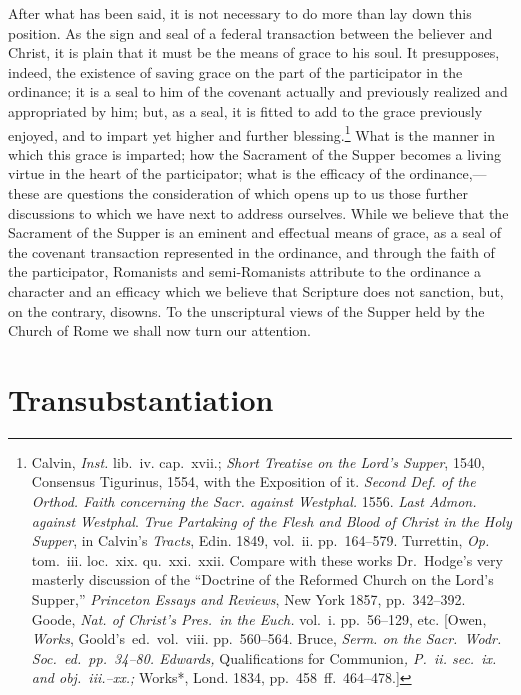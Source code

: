 \documentclass[
]{book}
\begin{document}
After what has been said, it is not necessary to do more than lay down this position. As the sign and seal of a federal transaction between the believer and Christ, it is plain that it must be the means of grace to his soul. It presupposes, indeed, the existence of saving grace on the part of the participator in the ordinance; it is a seal to him of the covenant actually and previously realized and appropriated by him; but, as a seal, it is fitted to add to the grace previously enjoyed, and to impart yet higher and further blessing.\footnote{Calvin, \emph{Inst.} lib.~iv. cap.~xvii.; \emph{Short Treatise on the Lord's Supper}, 1540, Consensus Tigurinus, 1554, with the Exposition of it. \emph{Second Def. of the Orthod. Faith concerning the Sacr. against Westphal.} 1556. \emph{Last Admon. against Westphal}. \emph{True Partaking of the Flesh and Blood of Christ in the Holy Supper}, in Calvin's \emph{Tracts}, Edin. 1849, vol.~ii. pp.~164--579. Turrettin, \emph{Op.} tom.~iii. loc.~xix. qu.~xxi.~xxii. Compare with these works Dr.~Hodge's very masterly discussion of the ``Doctrine of the Reformed Church on the Lord's Supper,'' \emph{Princeton Essays and Reviews}, New York 1857, pp.~342--392. Goode, \emph{Nat. of Christ's Pres.~in the Euch.} vol.~i. pp.~56--129, etc. {[}Owen, \emph{Works}, Goold's~ed.~vol.~viii. pp.~560--564. Bruce, \emph{Serm. on the Sacr.~Wodr. Soc.~ed.~pp.~34--80. Edwards, }Qualifications for Communion\emph{, P.~ii. sec.~ix. and obj.~iii.--xx.; }Works*, Lond. 1834, pp.~458~ff.~464--478.{]}} What is the manner in which this grace is imparted; how the Sacrament of the Supper becomes a living virtue in the heart of the participator; what is the efficacy of the ordinance,---these are questions the consideration of which opens up to us those further discussions to which we have next to address ourselves. While we believe that the Sacrament of the Supper is an eminent and effectual means of grace, as a seal of the covenant transaction represented in the ordinance, and through the faith of the participator, Romanists and semi-Romanists attribute to the ordinance a character and an efficacy which we believe that Scripture does not sanction, but, on the contrary, disowns. To the unscriptural views of the Supper held by the Church of Rome we shall now turn our attention.

\hypertarget{transubstantiation}{%
\section{Transubstantiation}\label{transubstantiation}}
\end{document}

